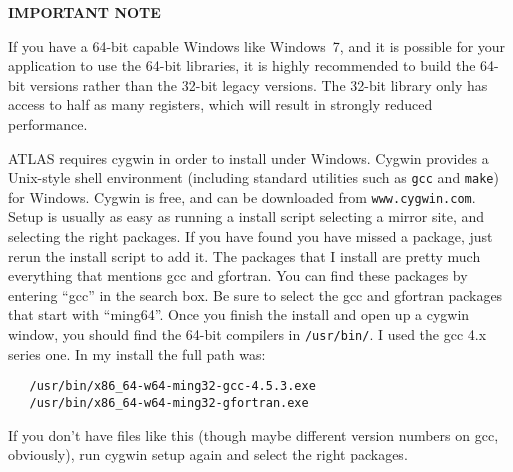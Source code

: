 \documentclass[11pt]{article}
\newcommand{\Wskip}[1]{ }
\begin{document}
\centerline{\Large\bf IMPORTANT NOTE}

If you have a 64-bit capable Windows like Windows~7, and it is possible
for your application to use the 64-bit libraries, it is highly recommended
to build the 64-bit versions rather than the 32-bit legacy versions.  The
32-bit library only has access to half as many registers, which will result
in strongly reduced performance.

ATLAS requires cygwin in order to install under Windows.  Cygwin
provides a Unix-style shell environment (including standard utilities such as
{\tt gcc} and {\tt make}) for Windows.  
Cygwin is free, and can be downloaded from {\tt www.cygwin.com}.  
Setup is usually as easy as running a install script selecting a mirror
site, and selecting the right packages.  If you have found you have
missed a package, just rerun the install script to add it.  The packages
that I install are pretty much everything that mentions gcc and gfortran.
You can find these packages by entering ``gcc'' in the search box.  Be sure
to select the gcc and gfortran packages that start with ``ming64''.
Once you finish the install and open up a cygwin window, you should
find the 64-bit compilers in \texttt{/usr/bin/}.  I used the gcc 4.x
series one.  In my install the full path was:
\begin{verbatim}
   /usr/bin/x86_64-w64-ming32-gcc-4.5.3.exe
   /usr/bin/x86_64-w64-ming32-gfortran.exe
\end{verbatim}

If you don't have files like this (though maybe different version numbers
on gcc, obviously), run cygwin setup again and select the right packages.

\Wskip{
Once these packages exist in \texttt{/usr/bin} (any version number is
OK on the gcc executable, as is no number at all), then the next step
is to change your path so that cygwin can find the 64-bit MinGW dlls,
which you can do with:
\begin{verbatim}
   export PATH=/usr/i686-w64-mingw32/sys-root/mingw/bin:$PATH
\end{verbatim}
}
\end{document}
